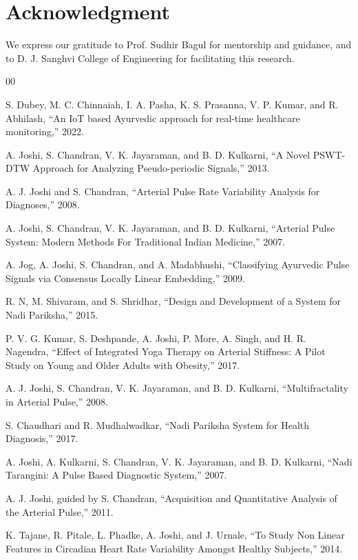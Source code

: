 \documentclass[10pt,twocolumn]{article}
\begin{document}
\section*{Acknowledgment}
We express our gratitude to Prof. Sudhir Bagul for mentorship and guidance, and to D. J. Sanghvi College of Engineering for facilitating this research.

\begin{thebibliography}{00}

 S. Dubey, M. C. Chinnaiah, I. A. Pasha, K. S. Prasanna, V. P. Kumar, and R. Abhilash, “An IoT based Ayurvedic approach for real-time healthcare monitoring,” 2022.

 A. Joshi, S. Chandran, V. K. Jayaraman, and B. D. Kulkarni, “A Novel PSWT-DTW Approach for Analyzing Pseudo-periodic Signals,” 2013.

 A. J. Joshi and S. Chandran, “Arterial Pulse Rate Variability Analysis for Diagnoses,” 2008.

 A. Joshi, S. Chandran, V. K. Jayaraman, and B. D. Kulkarni, “Arterial Pulse System: Modern Methods For Traditional Indian Medicine,” 2007.

 A. Jog, A. Joshi, S. Chandran, and A. Madabhushi, “Classifying Ayurvedic Pulse Signals via Consensus Locally Linear Embedding,” 2009.

 R. N, M. Shivaram, and S. Shridhar, “Design and Development of a System for Nadi Pariksha,” 2015.

 P. V. G. Kumar, S. Deshpande, A. Joshi, P. More, A. Singh, and H. R. Nagendra, “Effect of Integrated Yoga Therapy on Arterial Stiffness: A Pilot Study on Young and Older Adults with Obesity,” 2017.

 A. J. Joshi, S. Chandran, V. K. Jayaraman, and B. D. Kulkarni, “Multifractality in Arterial Pulse,” 2008.

 S. Chaudhari and R. Mudhalwadkar, “Nadi Pariksha System for Health Diagnosis,” 2017.

 A. Joshi, A. Kulkarni, S. Chandran, V. K. Jayaraman, and B. D. Kulkarni, “Nadi Tarangini: A Pulse Based Diagnostic System,” 2007.

 A. J. Joshi, guided by S. Chandran, “Acquisition and Quantitative Analysis of the Arterial Pulse,” 2011.

 K. Tajane, R. Pitale, L. Phadke, A. Joshi, and J. Urnale, “To Study Non Linear Features in Circadian Heart Rate Variability Amongst Healthy Subjects,” 2014.


\end{thebibliography}
\end{document}
